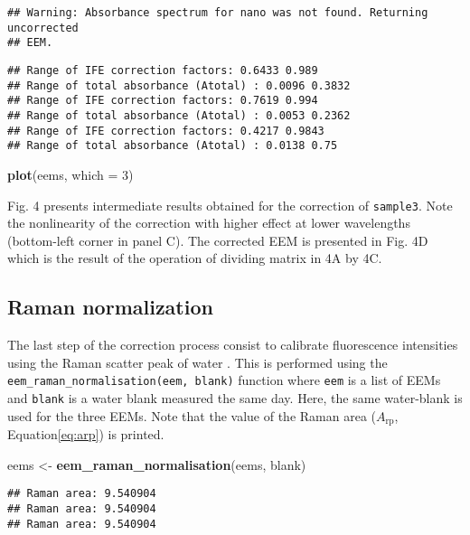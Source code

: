 \documentclass[]{book}
\newenvironment{Shaded}{\begin{snugshade}}{\end{snugshade}}
\newcommand{\KeywordTok}[1]{\textcolor[rgb]{0.13,0.29,0.53}{\textbf{{#1}}}}
\newcommand{\DataTypeTok}[1]{\textcolor[rgb]{0.13,0.29,0.53}{{#1}}}
\newcommand{\DecValTok}[1]{\textcolor[rgb]{0.00,0.00,0.81}{{#1}}}
\newcommand{\StringTok}[1]{\textcolor[rgb]{0.31,0.60,0.02}{{#1}}}
\newcommand{\NormalTok}[1]{{#1}}
\begin{document}
\begin{verbatim}
## Warning: Absorbance spectrum for nano was not found. Returning uncorrected
## EEM.
\end{verbatim}

\begin{verbatim}
## Range of IFE correction factors: 0.6433 0.989 
## Range of total absorbance (Atotal) : 0.0096 0.3832 
## Range of IFE correction factors: 0.7619 0.994 
## Range of total absorbance (Atotal) : 0.0053 0.2362 
## Range of IFE correction factors: 0.4217 0.9843 
## Range of total absorbance (Atotal) : 0.0138 0.75
\end{verbatim}

\begin{Shaded}
\begin{Highlighting}[]
\KeywordTok{plot}\NormalTok{(eems, }\DataTypeTok{which =} \DecValTok{3}\NormalTok{)}
\end{Highlighting}
\end{Shaded}

Fig. 4 presents intermediate results obtained for the correction of
\texttt{sample3}. Note the nonlinearity of the correction with higher
effect at lower wavelengths (bottom-left corner in panel C). The
corrected EEM is presented in Fig. 4D which is the result of the
operation of dividing matrix in 4A by 4C.

\subsection{Raman normalization}\label{raman-normalization}

The last step of the correction process consist to calibrate
fluorescence intensities using the Raman scatter peak of water
\citep{Lawaetz2009}. This is performed using the
\texttt{eem\_raman\_normalisation(eem,\ blank)} function where
\texttt{eem} is a list of EEMs and \texttt{blank} is a water blank
measured the same day. Here, the same water-blank is used for the three
EEMs. Note that the value of the Raman area (\(A_{\text{rp}}\),
Equation\ref{eq:arp}) is printed.

\begin{Shaded}
\begin{Highlighting}[]
\NormalTok{eems <-}\StringTok{ }\KeywordTok{eem_raman_normalisation}\NormalTok{(eems, blank)}
\end{Highlighting}
\end{Shaded}

\begin{verbatim}
## Raman area: 9.540904 
## Raman area: 9.540904 
## Raman area: 9.540904
\end{verbatim}
\end{document}
